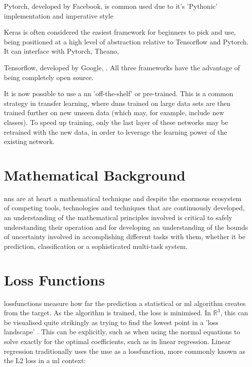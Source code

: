 Pytorch, developed by Facebook, is common used due to it's 'Pythonic' implementation and imperative style 


Keras is often considered the easiest framework for beginners to pick and use, being positioned at a high level of abstraction relative to Tensorflow and Pytorch. It can interface with Pytorch, Theano,  \bigskip

Tensorflow, developed by Google,  \cite{tale_dl}. All three frameworks have the advantage of being completely open source. \bigskip

It is now possible to use a  \gls{nn} 'off-the-shelf' or pre-trained. This is a common strategy in transfer learning, where \gls{dnn}s trained on large data sets are then trained further on new unseen data (which may, for example, include new classes). To speed up training, only the last layer of these networks may be retrained with the new data, in order to leverage the learning power of the existing network. \bigskip

\section*{Mathematical Background}


\gls{nn}s are at heart a mathematical technique and despite the enormous ecosystem of competing tools, technologies and techniques that are continuously developed, an understanding of the mathematical principles involved  is critical to safely understanding their operation and for developing an understanding of the bounds of uncertainty involved in accomplishing different tasks with them, whether it be prediction, classification or a sophisticated multi-task system.

\section{Loss Functions}

\gls{lossfunction}s measure how far the prediction a statistical or \gls{ml} algorithm creates from the target. As the algorithm is trained, the loss is minimised. In $\mathds{R}^3$, this can be visualised quite strikingly as trying to find the lowest point in a 'loss landscape' \cite{loss_landscape}. This can be explicitly, such as when using the normal equations to solve exactly for the optimal coefficients, such as in linear regression. Linear regression traditionally uses the  \gls{mse} as a \gls{lossfunction}, more commonly known as the L2 loss in a \gls{ml} context:


